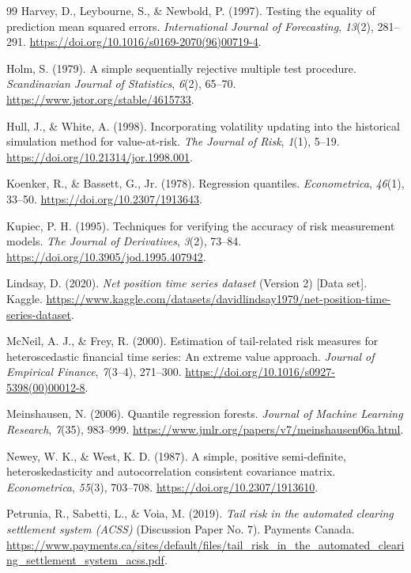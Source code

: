 \documentclass[11pt,a4paper]{article}
\begin{document}
\begin{thebibliography}{99}
 Harvey, D., Leybourne, S., \& Newbold, P. (1997). Testing the equality of prediction mean squared errors. \emph{International Journal of Forecasting}, \emph{13}(2), 281--291. \url{https://doi.org/10.1016/s0169-2070(96)00719-4}.

 Holm, S. (1979). A simple sequentially rejective multiple test procedure. \emph{Scandinavian Journal of Statistics}, \emph{6}(2), 65--70. \url{https://www.jstor.org/stable/4615733}.

 Hull, J., \& White, A. (1998). Incorporating volatility updating into the historical simulation method for value-at-risk. \emph{The Journal of Risk}, \emph{1}(1), 5--19. \url{https://doi.org/10.21314/jor.1998.001}.

 Koenker, R., \& Bassett, G., Jr. (1978). Regression quantiles. \emph{Econometrica}, \emph{46}(1), 33--50. \url{https://doi.org/10.2307/1913643}.

 Kupiec, P. H. (1995). Techniques for verifying the accuracy of risk measurement models. \emph{The Journal of Derivatives}, \emph{3}(2), 73--84. \url{https://doi.org/10.3905/jod.1995.407942}.

 Lindsay, D. (2020). \emph{Net position time series dataset} (Version 2) [Data set]. Kaggle. \url{https://www.kaggle.com/datasets/davidlindsay1979/net-position-time-series-dataset}.

 McNeil, A. J., \& Frey, R. (2000). Estimation of tail-related risk measures for heteroscedastic financial time series: An extreme value approach. \emph{Journal of Empirical Finance}, \emph{7}(3--4), 271--300. \url{https://doi.org/10.1016/s0927-5398(00)00012-8}.

 Meinshausen, N. (2006). Quantile regression forests. \emph{Journal of Machine Learning Research}, \emph{7}(35), 983--999. \url{https://www.jmlr.org/papers/v7/meinshausen06a.html}.

 Newey, W. K., \& West, K. D. (1987). A simple, positive semi-definite, heteroskedasticity and autocorrelation consistent covariance matrix. \emph{Econometrica}, \emph{55}(3), 703--708. \url{https://doi.org/10.2307/1913610}.

 Petrunia, R., Sabetti, L., \& Voia, M. (2019). \emph{Tail risk in the automated clearing settlement system (ACSS)} (Discussion Paper No. 7). Payments Canada. \url{https://www.payments.ca/sites/default/files/tail_risk_in_the_automated_clearing_settlement_system_acss.pdf}.


\end{thebibliography}
\end{document}

